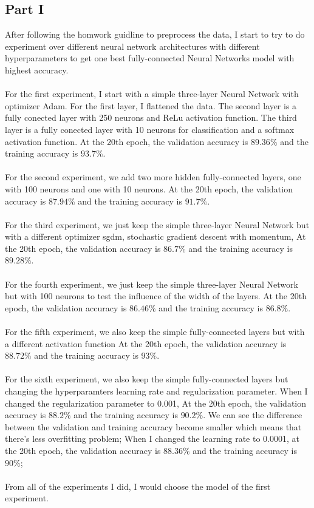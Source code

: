 \documentclass[12pt,letterpaper]{article}
\begin{document}
\subsection*{Part I}
After following the homwork guidline to preprocess the data, I start to try to do experiment over different neural network architectures with different hyperparameters to get one best fully-connected Neural Networks model with highest accuracy. 
\\
\\For the first experiment, I start with a simple three-layer Neural Network with optimizer Adam. For the first layer, I flattened the data. The second layer is a fully conected layer with 250 neurons and ReLu activation function. The third layer is a fully conected layer with 10 neurons for classification and a softmax activation function. At the 20th epoch, the validation accuracy is $89.36\%$ and the training accuracy is $93.7\%$. 
\\
\\For the second experiment, we add two more hidden fully-connected layers, one with 100 neurons and one with 10 neurons. At the 20th epoch, the validation accuracy is $87.94\%$ and the training accuracy is $91.7\%$.
\\
\\For the third experiment, we just keep the simple three-layer Neural Network but with a different optimizer sgdm, stochastic gradient descent with momentum, At the 20th epoch, the validation accuracy is $86.7\%$ and the training accuracy is $89.28\%$.
\\
\\ For the fourth experiment, we just keep the simple three-layer Neural Network but with 100 neurons to test the influence of the width of the layers. At the 20th epoch, the validation accuracy is $86.46\%$ and the training accuracy is $86.8\%$.
\\
\\ For the fifth experiment, we also keep the simple fully-connected layers but with a different activation function At the 20th epoch, the validation accuracy is $88.72\%$ and the training accuracy is $93\%$.
\\
\\For the sixth experiment, we also keep the simple fully-connected layers but changing the hyperparamters learning rate and regularization parameter. When I changed the regularization parameter to 0.001, At the 20th epoch, the validation accuracy is $88.2\%$ and the training accuracy is $90.2\%$. We can see the difference between the validation and training accuracy become smaller which means that there's less overfitting problem; When I changed the learning rate to 0.0001, at the 20th epoch, the validation accuracy is $88.36\%$ and the training accuracy is $90\%$;
\\
\\From all of the experiments I did, I would choose the model of the first experiment.
\end{document}
